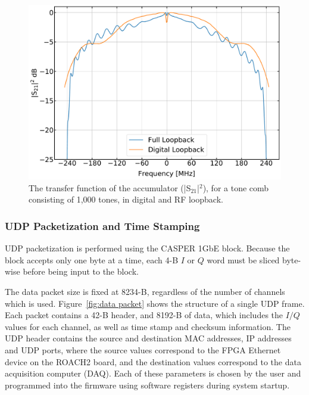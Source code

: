 \begin{figure}[!htbp]
\centering
\includegraphics[width=\textwidth]{figures/readout/sim/accum_1000_lpf_nolpf}
\caption[~The transfer function of the accumulator (), for a tone comb consisting of 1,000 tones, in digital and RF loopback.]{The transfer function of the accumulator (|S$_{21}$|$^{2}$), for a tone comb consisting of 1,000 tones, in digital and RF loopback.}
\label{fig:accum}
\end{figure}

\subsubsection{UDP Packetization and Time Stamping}\label{packets}

UDP packetization is performed using the CASPER 1GbE block. Because the block accepts only one byte at a time, each 4-B $I$ or $Q$ word must be sliced byte-wise before being input to the block.

The data packet size is fixed at 8234-B, regardless of the number of channels which is used. Figure~\ref{fig:data packet} shows the structure of a single UDP frame. Each packet contains a 42-B header, and 8192-B of data, which includes the $I/Q$ values for each channel, as well as time stamp and checksum information. The UDP header contains the source and destination MAC addresses, IP addresses and UDP ports, where the source values correspond to the FPGA Ethernet device on the ROACH2 board, and the destination values correspond to the data acquisition computer (DAQ). Each of these parameters is chosen by the user and programmed into the firmware using software registers during system startup.

